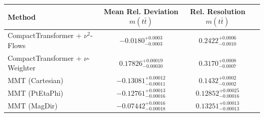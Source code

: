     \begin{tabular}{lccc}
        \toprule
        Method & Mean Rel. Deviation $m(t\bar{t})$ & Rel. Resolution $m(t\bar{t})$ \\
        \midrule
        CompactTransformer + $\nu^2$-Flows & $-0.0180^{+0.0003}_{-0.0003}$ & $0.2422^{+0.0006}_{-0.0010}$ \\
        CompactTransformer + $\nu$-Weighter & $0.17826^{+0.00019}_{-0.00030}$ & $0.3170^{+0.0008}_{-0.0007}$ \\
        MMT (Cartesian) & $-0.13081^{+0.00012}_{-0.00011}$ & $0.1432^{+0.0002}_{-0.0002}$ \\
        MMT (PtEtaPhi) & $-0.12761^{+0.00013}_{-0.00016}$ & $0.12852^{+0.00025}_{-0.00016}$ \\
        MMT (MagDir) & $-0.07442^{+0.00016}_{-0.00018}$ & $0.13251^{+0.00013}_{-0.00013}$ \\
        \bottomrule
    \end{tabular}